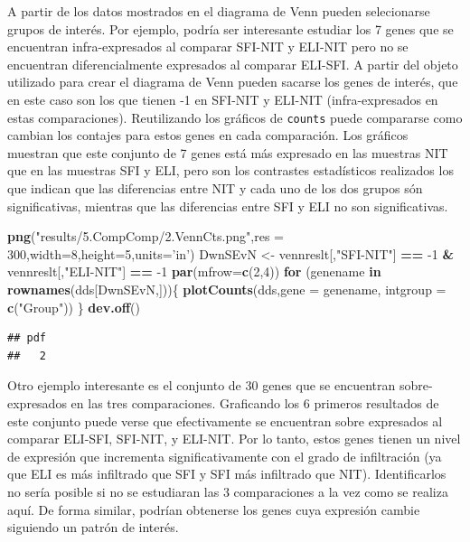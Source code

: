 \documentclass[
]{article}
\newenvironment{Shaded}{\begin{snugshade}}{\end{snugshade}}
\newcommand{\ControlFlowTok}[1]{\textcolor[rgb]{0.13,0.29,0.53}{\textbf{#1}}}
\newcommand{\DataTypeTok}[1]{\textcolor[rgb]{0.13,0.29,0.53}{#1}}
\newcommand{\DecValTok}[1]{\textcolor[rgb]{0.00,0.00,0.81}{#1}}
\newcommand{\KeywordTok}[1]{\textcolor[rgb]{0.13,0.29,0.53}{\textbf{#1}}}
\newcommand{\NormalTok}[1]{#1}
\newcommand{\OperatorTok}[1]{\textcolor[rgb]{0.81,0.36,0.00}{\textbf{#1}}}
\newcommand{\StringTok}[1]{\textcolor[rgb]{0.31,0.60,0.02}{#1}}
\begin{document}
A partir de los datos mostrados en el diagrama de Venn pueden
selecionarse grupos de interés. Por ejemplo, podría ser interesante
estudiar los 7 genes que se encuentran infra-expresados al comparar
SFI-NIT y ELI-NIT pero no se encuentran diferencialmente expresados al
comparar ELI-SFI. A partir del objeto utilizado para crear el diagrama
de Venn pueden sacarse los genes de interés, que en este caso son los
que tienen -1 en SFI-NIT y ELI-NIT (infra-expresados en estas
comparaciones). Reutilizando los gráficos de \texttt{counts} puede
compararse como cambian los contajes para estos genes en cada
comparación. Los gráficos muestran que este conjunto de 7 genes está más
expresado en las muestras NIT que en las muestras SFI y ELI, pero son
los contrastes estadísticos realizados los que indican que las
diferencias entre NIT y cada uno de los dos grupos són significativas,
mientras que las diferencias entre SFI y ELI no son significativas.

\begin{Shaded}
\begin{Highlighting}[]
\KeywordTok{png}\NormalTok{(}\StringTok{"results/5.CompComp/2.VennCts.png"}\NormalTok{,}\DataTypeTok{res =} \DecValTok{300}\NormalTok{,}\DataTypeTok{width=}\DecValTok{8}\NormalTok{,}\DataTypeTok{height=}\DecValTok{5}\NormalTok{,}\DataTypeTok{units=}\StringTok{'in'}\NormalTok{)}
\NormalTok{DwnSEvN <-}\StringTok{ }\NormalTok{vennreslt[,}\StringTok{"SFI-NIT"}\NormalTok{] }\OperatorTok{==}\StringTok{ }\DecValTok{-1} \OperatorTok{&}\StringTok{ }\NormalTok{vennreslt[,}\StringTok{"ELI-NIT"}\NormalTok{] }\OperatorTok{==}\StringTok{ }\DecValTok{-1} 
\KeywordTok{par}\NormalTok{(}\DataTypeTok{mfrow=}\KeywordTok{c}\NormalTok{(}\DecValTok{2}\NormalTok{,}\DecValTok{4}\NormalTok{))}
\ControlFlowTok{for}\NormalTok{ (genename }\ControlFlowTok{in} \KeywordTok{rownames}\NormalTok{(dds[DwnSEvN,]))\{}
  \KeywordTok{plotCounts}\NormalTok{(dds,}\DataTypeTok{gene =}\NormalTok{ genename, }\DataTypeTok{intgroup =} \KeywordTok{c}\NormalTok{(}\StringTok{"Group"}\NormalTok{))}
\NormalTok{\}}
\KeywordTok{dev.off}\NormalTok{()}
\end{Highlighting}
\end{Shaded}

\begin{verbatim}
## pdf 
##   2
\end{verbatim}

Otro ejemplo interesante es el conjunto de 30 genes que se encuentran
sobre-expresados en las tres comparaciones. Graficando los 6 primeros
resultados de este conjunto puede verse que efectivamente se encuentran
sobre expresados al comparar ELI-SFI, SFI-NIT, y ELI-NIT. Por lo tanto,
estos genes tienen un nivel de expresión que incrementa
significativamente con el grado de infiltración (ya que ELI es más
infiltrado que SFI y SFI más infiltrado que NIT). Identificarlos no
sería posible si no se estudiaran las 3 comparaciones a la vez como se
realiza aquí. De forma similar, podrían obtenerse los genes cuya
expresión cambie siguiendo un patrón de interés.
\end{document}
